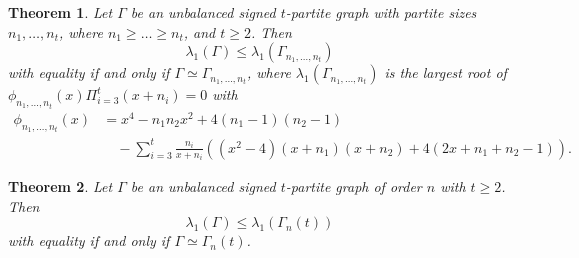 \documentclass[10pt,a4paper]{amsart}
\numberwithin{equation}{section}
\newtheorem {Theorem} {Theorem}[section]
\newtheorem {Corollary}{Corollary}[section]
\begin{document}
\begin{Theorem}\label{N1}
Let $\Gamma$ be an unbalanced signed $t$-partite graph with partite sizes $n_1, \dots, n_t$, where $n_1\ge \dots\ge n_t$, and $t\ge 2$. Then
\[
\lambda_1(\Gamma)\le \lambda_1\left(\Gamma_{n_1, \dots, n_t}\right)
\]
with equality if and only if $\Gamma\simeq \Gamma_{n_1, \dots, n_t}$, where 
$\lambda_1\left(\Gamma_{n_1, \dots, n_t}\right)$ is the largest root of $\phi_{n_1,\dots, n_t}(x)\Pi_{i=3}^t(x+n_i)=0$ with 
\begin{align*}
\phi_{n_1,\dots, n_t}(x)&=
x^4-n_1n_2x^2+4(n_1-1)(n_2-1)\\
&\quad -\sum_{i=3}^{t}\frac{n_i}{x+n_i}\left((x^2-4)(x+n_1)(x+n_2)+4(2x+n_1+n_2-1)\right).
\end{align*}
\end{Theorem}






\begin{Theorem}\label{N2}
Let $\Gamma$ be an unbalanced signed $t$-partite graph of order $n$ with $t\ge 2$. Then
\[
\lambda_1(\Gamma)\le \lambda_1\left(\Gamma_n(t)\right)
\]
with equality if and only if $\Gamma\simeq \Gamma_n(t)$.
\end{Theorem}




%
%

%
%
%
\end{document}
